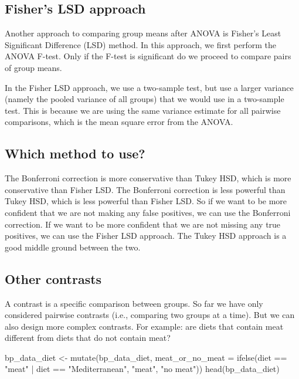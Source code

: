 \documentclass[
  letterpaper,
  8pt,
  a4paper]{book}
\newenvironment{Shaded}{\begin{snugshade}}{\end{snugshade}}
\newcommand{\AttributeTok}[1]{\textcolor[rgb]{0.40,0.45,0.13}{#1}}
\newcommand{\FunctionTok}[1]{\textcolor[rgb]{0.28,0.35,0.67}{#1}}
\newcommand{\NormalTok}[1]{\textcolor[rgb]{0.00,0.23,0.31}{#1}}
\newcommand{\OtherTok}[1]{\textcolor[rgb]{0.00,0.23,0.31}{#1}}
\newcommand{\SpecialCharTok}[1]{\textcolor[rgb]{0.37,0.37,0.37}{#1}}
\newcommand{\StringTok}[1]{\textcolor[rgb]{0.13,0.47,0.30}{#1}}
\begin{document}
\subsection*{Fisher's LSD approach}\label{fishers-lsd-approach}

Another approach to comparing group means after ANOVA is Fisher's Least
Significant Difference (LSD) method. In this approach, we first perform
the ANOVA F-test. Only if the F-test is significant do we proceed to
compare pairs of group means.

In the Fisher LSD approach, we use a two-sample test, but use a larger
variance (namely the pooled variance of all groups) that we would use in
a two-sample test. This is because we are using the same variance
estimate for all pairwise comparisons, which is the mean square error
from the ANOVA.

\subsection*{Which method to use?}\label{which-method-to-use}

The Bonferroni correction is more conservative than Tukey HSD, which is
more conservative than Fisher LSD. The Bonferroni correction is less
powerful than Tukey HSD, which is less powerful than Fisher LSD. So if
we want to be more confident that we are not making any false positives,
we can use the Bonferroni correction. If we want to be more confident
that we are not missing any true positives, we can use the Fisher LSD
approach. The Tukey HSD approach is a good middle ground between the
two.

\subsection*{Other contrasts}\label{other-contrasts}

A contrast is a specific comparison between groups. So far we have only
considered pairwise contrasts (i.e., comparing two groups at a time).
But we can also design more complex contrasts. For example: are diets
that contain meat different from diets that do not contain meat?

\begin{Shaded}
\begin{Highlighting}[]
\NormalTok{bp\_data\_diet }\OtherTok{\textless{}{-}} \FunctionTok{mutate}\NormalTok{(bp\_data\_diet,}
                       \AttributeTok{meat\_or\_no\_meat =} \FunctionTok{ifelse}\NormalTok{(diet }\SpecialCharTok{==} \StringTok{"meat"} \SpecialCharTok{|}
\NormalTok{                                                diet }\SpecialCharTok{==} \StringTok{"Mediterranean"}\NormalTok{,}
                                                \StringTok{"meat"}\NormalTok{, }\StringTok{"no meat"}\NormalTok{))}
\FunctionTok{head}\NormalTok{(bp\_data\_diet)}
\end{Highlighting}
\end{Shaded}
\end{document}
